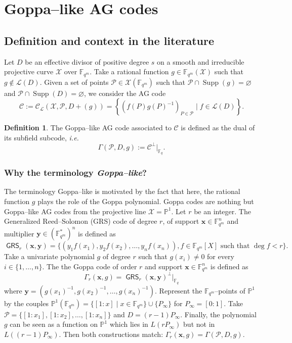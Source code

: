 \documentclass[a4paper]{article}
\theoremstyle{definition}
\newtheorem{definition}[thm]{Definition}
\theoremstyle{remark}
\newcommand{\calP}{\mathcal{P}}
\newcommand{\calL}{\mathcal{L}}
\newcommand{\calC}{\mathcal{C}}
\newcommand{\calX}{\mathcal{X}}
\newcommand{\fqm}{\mathbb{F}_{q^m}}
\newcommand{\fq}{\mathbb{F}_{q}}
\newcommand{\PP}{\mathbb{P}}
\newcommand{\set}[1]{\left\{#1\right\}}
\newcommand{\Supp}{\operatorname{Supp}}
\newcommand{\GRS}{\operatorname{\mathsf{GRS}}}
\begin{document}
\section{Goppa--like AG codes}\label{sec:Goppa}
\subsection{Definition and context in the literature}\label{subsec:def-Goppa}
Let $D$ be an effective divisor of positive degree $s$ on a smooth and irreducible projective curve $\calX$ over $\fqm$. Take a rational function $g \in \fqm(\calX)$ such that $g \notin \calL(D)$. Given a set of points $\calP \in \calX(\fqm)$ such that $\calP \cap \Supp(g) = \varnothing$ and $\calP \cap \Supp(D) = \varnothing$, we consider the AG code
\[\calC := \calC_{\calL}(\calX,\calP,D+(g))=\set{\left(f(P)g(P)^{-1}\right)_{P \in \calP} \mid f \in \calL(D)}.\]
\begin{definition} \label{def:Goppa--like_AG_code}
The Goppa--like AG code associated to $\calC$ is defined as the dual of its subfield subcode, \emph{i.e.}
$$ \Gamma(\calP,D,g) := \calC^{\perp}|_{\fq}.$$
\end{definition}
\subsubsection{Why the terminology \textit{Goppa--like}?}
The terminology Goppa--like is motivated by the fact that here, the rational function $g$ plays the role of the Goppa polynomial. Goppa codes are nothing but Goppa--like AG codes from the projective line $\calX=\PP^1$.
Let $r$ be an integer. The Generalized Reed--Solomon (GRS) code of degree $r$, of support $\mathbf{x} \in \fqm^n$ and multiplier $\mathbf{y} \in (\fqm^*)^n$ is defined as
\[\GRS_r(\mathbf{x},\mathbf{y})=\{(y_1f(x_1),y_2f(x_2),\dots,y_nf(x_n)), f \in \fqm[X] \text{ such that } \deg f < r \}.\]
Take a univariate polynomial $g$ of degree $r$ such that $g(x_i) \neq 0$ for every  $i \in \{1,\dots,n\}$. The the Goppa code of order $r$ and support $\mathbf{x} \in \fqm^n$ is defined as
\[\Gamma_r(\mathbf{x},g)= \GRS_r(\mathbf{x},\mathbf{y})^\perp|_{\fq}\]
where $\mathbf{y}=(g(x_1)^{-1},g(x_2)^{-1},\dots,g(x_n)^{-1})$.
Represent the $\fqm$--points of $\PP^1$ by the couples $\PP^1(\fqm)=\{[1:x] \mid x \in \fqm\} \cup \{P_\infty\}$ for $P_\infty=[0:1]$. Take $\calP=\{[1:x_1],[1:x_2],\dots,[1:x_n]\}$ and $D=(r-1)P_\infty$. Finally, the polynomial $g$ can be seen as a function on $\PP^1$ which lies in $L(rP_\infty)$ but not in $L((r-1)P_\infty)$. Then both constructions match: $\Gamma_r(\mathbf{x},g)=\Gamma(\calP,D,g)$.
\end{document}
